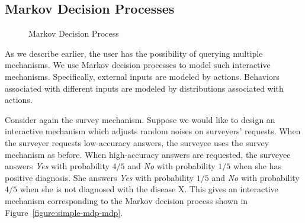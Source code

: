 \subsection{Markov Decision Processes}


\begin{wrapfigure}{r}{.5\columnwidth}
  \centering
    \caption{Markov Decision Process}
    \label{figure:simple-mdp}
\end{wrapfigure}


As we describe earlier, the user has the possibility of querying multiple mechanisms.
We use Markov decision processes to model such
interactive mechanisms. Specifically, external inputs are modeled by
actions. Behaviors associated with different inputs are modeled by
distributions associated with actions.


Consider again the survey mechanism. Suppose we would like to design
an interactive mechanism which adjusts random noises on surveyers'
requests. When the surveyer requests low-accuracy answers, the
surveyee uses the survey mechanism as before. When high-accuracy
answers are requested, the surveyee answers \textit{Yes} with
probability $4/5$ and \textit{No} with probability $1/5$ when she has
positive diagnosis. She answers \textit{Yes} with probability $1/5$
and \textit{No} with probability $4/5$ when she is not
diagnosed with the disease X. This gives an interactive mechanism
corresponding to the Markov decision process shown in
Figure~\ref{figure:simple-mdp-mdp}.

